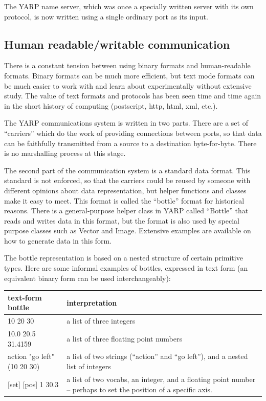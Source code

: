The YARP name server, which was once a specially written server with
its own protocol, is now written using a single ordinary port as its
input.





\subsection{Human readable/writable communication}

There is a constant tension between using binary formats and
human-readable formats.  Binary formats can be much more efficient,
but text mode formats can be much easier to work with and learn about
experimentally without extensive study.  The value of text formats and
protocols has been seen time and time again in the short history of
computing (postscript, http, html, xml, etc.).

The YARP communications system is written in two parts.  There
are a set of ``carriers'' which do the work of providing
connections between ports, so that data can be faithfully 
transmitted from a source to a destination byte-for-byte.
There is no marshalling process at this stage.

The second part of the communication system is a standard data format.
This standard is not enforced, so that the carriers could be reused by
someone with different opinions about data representation, but helper
functions and classes make it easy to meet.  This format is called the
``bottle'' format for historical reasons.  There is a general-purpose
helper class in YARP called ``Bottle'' that reads and writes data in
this format, but the format is also used by special purpose classes
such as Vector and Image.  Extensive examples are available on how
to generate data in this form.

The bottle representation is based on a nested structure of certain
primitive types.  Here are some informal examples of bottles,
expressed in text form (an equivalent binary form can be used
interchangeably):

\begin{center}
\begin{tabular}{lp{6cm}}
\hline\hline
{\bf text-form bottle} & {\bf interpretation} \\
\hline
10 20 30 & a list of three integers \\
10.0 20.5 31.4159 & a list of three floating point numbers \\
action "go left" (10 20 30) & a list of two strings (``action'' and ``go left''), and a nested list of integers \\
{[set] [pos] 1 30.3} & a list of two vocabs, an integer, and a floating
point number -- perhaps to set the position of a specific axis. \\
\hline\hline
\end{tabular}
\end{center}

